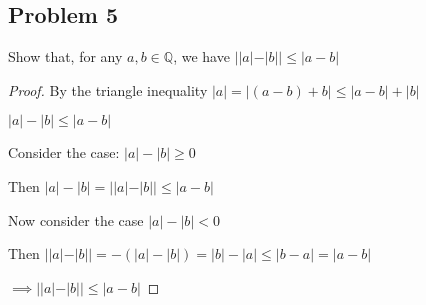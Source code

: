 \documentclass[12pt, a4paper]{article}
\begin{document}
    \subsection*{Problem 5}
        Show that, for any $a,b \in \mathbb{Q}$, we have $||a|-|b|| \le |a-b|$
        \begin{proof}
            By the triangle inequality $|a|=|(a-b)+b| \le |a-b| + |b|$

            $|a|-|b| \le |a-b|$

            Consider the case: $|a|-|b| \ge 0$

            Then $|a|-|b| = ||a|-|b|| \le |a-b|$

            Now consider the case $|a|-|b| < 0$

            Then $||a|-|b|| = -(|a|-|b|) = |b|-|a| \le |b-a| = |a-b|$

            $\implies ||a|-|b|| \le |a-b|$ 
        \end{proof}
\end{document}
